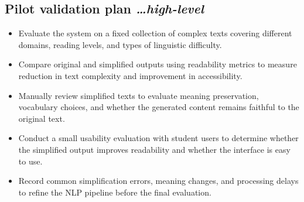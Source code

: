 \documentclass[11pt,a4paper]{article}
\newcommand{\BvrHint}[1]{%
  {\normalfont\normalsize\itshape\hfill #1}}
\begin{document}
\subsection{Pilot validation plan %
\BvrHint{\ldots high-level}}

\begin{itemize}[leftmargin=0.7cm]

    \item Evaluate the system on a fixed collection of complex texts covering different domains, reading levels, and types of linguistic difficulty.

    \item Compare original and simplified outputs using readability metrics to measure reduction in text complexity and improvement in accessibility.

    \item Manually review simplified texts to evaluate meaning preservation, vocabulary choices, and whether the generated content remains faithful to the original text.

    \item Conduct a small usability evaluation with student users to determine whether the simplified output improves readability and whether the interface is easy to use.

    \item Record common simplification errors, meaning changes, and processing delays to refine the NLP pipeline before the final evaluation.

\end{itemize}
\end{document}
